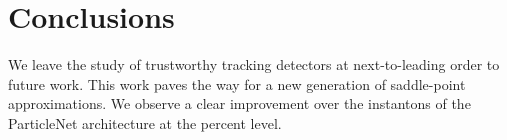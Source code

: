 \section{Conclusions}\label{sec:conclusions}

We leave the study of trustworthy tracking detectors at next-to-leading
order to future work. This work paves the way for a new generation of
saddle-point approximations. We observe a clear improvement over the
instantons of the ParticleNet architecture at the percent level.

